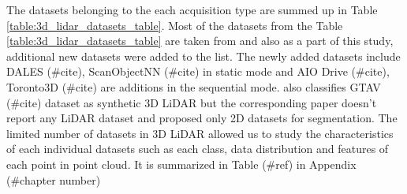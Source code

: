 The datasets belonging to the each acquisition type are summed up in  Table \ref{table:3d_lidar_datasets_table}.
Most of the datasets from the Table \ref{table:3d_lidar_datasets_table} are taken from \cite{survey3d} and also as a part of this study, additional new datasets were added to the list.
The newly added datasets include DALES (\#cite), ScanObjectNN (\#cite) in static mode and AIO Drive (\#cite), Toronto3D (\#cite) are additions in the sequential mode.
\cite{survey3d} also classifies GTAV (\#cite) dataset as synthetic 3D LiDAR but the corresponding paper doesn't report any LiDAR dataset and proposed only 2D datasets for segmentation.
The limited number of datasets in 3D LiDAR allowed us to study the characteristics of each individual datasets such as each class, data distribution and features of each point in point cloud. 
It is summarized in Table (\#ref) in Appendix (\#chapter number)

